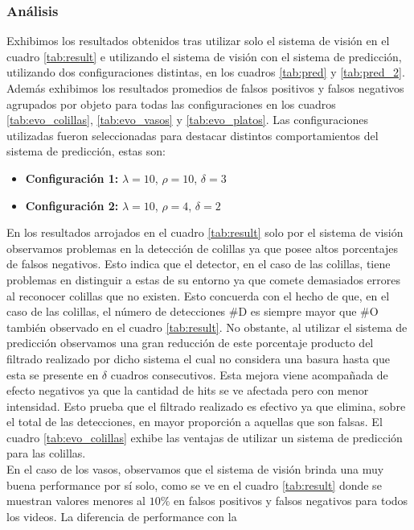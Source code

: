 \subsubsection{Análisis}
Exhibimos los resultados obtenidos tras utilizar solo el sistema de 
visión en el cuadro \ref{tab:result} e utilizando el sistema de 
visión con el sistema de predicción, utilizando dos configuraciones 
distintas, en 
los cuadros \ref{tab:pred} y  \ref{tab:pred_2}. Además exhibimos los 
resultados promedios de falsos positivos y falsos negativos agrupados 
por objeto para todas las configuraciones en los cuadros \ref{tab:evo_colillas}, 
\ref{tab:evo_vasos} y \ref{tab:evo_platos}. Las configuraciones 
utilizadas fueron seleccionadas para destacar distintos comportamientos del 
sistema de predicción, estas son:
\begin{itemize}
\item{\textbf{Configuración 1:} $\lambda=10$, $\rho=10$, $\delta=3$}
	\item{\textbf{Configuración 2:} $\lambda=10$, $\rho=4$, $\delta=2$}
\end{itemize}
\indent En los resultados arrojados en el cuadro \ref{tab:result} solo por el sistema de visión 
observamos problemas en la  detección de colillas ya que posee altos 
porcentajes de falsos negativos. Esto indica que el detector, en el 
caso de las colillas, tiene
problemas en distinguir a estas de su entorno ya que comete 
demasiados errores al reconocer colillas que no existen. Esto concuerda 
con el hecho de que, en el caso de las colillas, el número de 
detecciones \#D es siempre mayor que \#O también observado en el 
cuadro \ref{tab:result}. No obstante, al utilizar el sistema de 
predicción observamos una gran reducción de este porcentaje producto 
del filtrado realizado por dicho sistema el cual no considera una 
basura hasta que esta se presente en $\delta$ cuadros consecutivos.  
Esta mejora viene acompañada de efecto negativos ya que la cantidad de 
hits se ve afectada pero con menor intensidad. Esto prueba que el 
filtrado realizado es efectivo ya que elimina, sobre el total de las 
detecciones, en mayor proporción a 
aquellas que son falsas. El cuadro \ref{tab:evo_colillas} exhibe las ventajas de utilizar un sistema de 
predicción para las colillas.\\
\indent 
En el caso de los vasos, observamos que el sistema de visión brinda 
una muy buena performance por sí solo, como se ve en el cuadro \ref{tab:result} 
donde se muestran valores menores al $10\%$ en falsos positivos y falsos 
negativos para todos los videos. La diferencia de performance con la 
